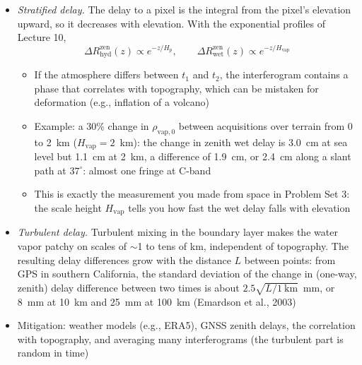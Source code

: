 \documentclass[11pt, oneside]{article}
\begin{document}
\begin{itemize}
	\item \emph{Stratified delay.} The delay to a pixel is the integral from the pixel's elevation upward, so it decreases with elevation. With the exponential profiles of Lecture 10,
	\begin{equation}
		\label{e:strat}
		\Delta R^\mathrm{zen}_\mathrm{hyd}(z) \propto e^{-z/H_p}, \qquad \Delta R^\mathrm{zen}_\mathrm{wet}(z) \propto e^{-z/H_\mathrm{vap}}
	\end{equation}
	\begin{itemize}
		\item If the atmosphere differs between $t_1$ and $t_2$, the interferogram contains a phase that correlates with topography, which can be mistaken for deformation (e.g., inflation of a volcano)
		\item Example: a 30\% change in $\rho_{\mathrm{vap},0}$ between acquisitions over terrain from 0 to 2~km ($H_\mathrm{vap} = 2$~km): the change in zenith wet delay is 3.0~cm at sea level but 1.1~cm at 2~km, a difference of 1.9~cm, or 2.4~cm along a slant path at $37^\circ$: almost one fringe at C-band
		\item This is exactly the measurement you made from space in Problem Set 3: the scale height $H_\mathrm{vap}$ tells you how fast the wet delay falls with elevation
	\end{itemize}
	\item \emph{Turbulent delay.} Turbulent mixing in the boundary layer makes the water vapor patchy on scales of $\sim$1 to tens of km, independent of topography. The resulting delay differences grow with the distance $L$ between points: from GPS in southern California, the standard deviation of the change in (one-way, zenith) delay difference between two times is about $2.5\sqrt{L/\mathrm{1~km}}$~mm, or 8~mm at 10~km and 25~mm at 100~km (Emardson et al., 2003)
	\item Mitigation: weather models (e.g., ERA5), GNSS zenith delays, the correlation with topography, and averaging many interferograms (the turbulent part is random in time)
\end{itemize}
\end{document}
